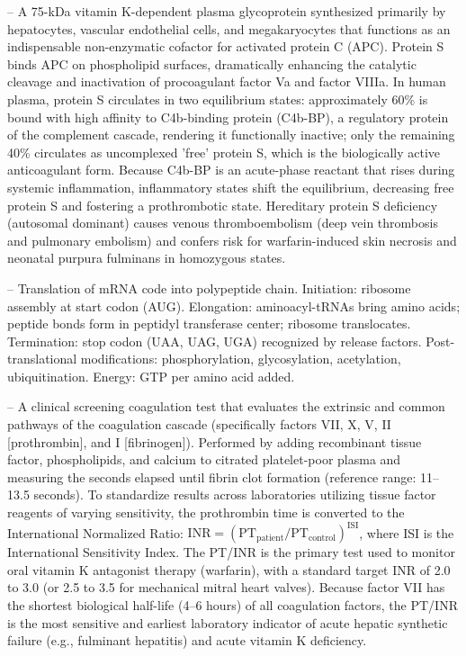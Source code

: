 -- A 75-kDa vitamin K-dependent plasma glycoprotein synthesized primarily by hepatocytes, vascular endothelial cells, and megakaryocytes that functions as an indispensable non-enzymatic cofactor for activated protein C (APC). Protein S binds APC on phospholipid surfaces, dramatically enhancing the catalytic cleavage and inactivation of procoagulant factor Va and factor VIIIa. In human plasma, protein S circulates in two equilibrium states: approximately 60\% is bound with high affinity to C4b-binding protein (C4b-BP), a regulatory protein of the complement cascade, rendering it functionally inactive; only the remaining 40\% circulates as uncomplexed 'free' protein S, which is the biologically active anticoagulant form. Because C4b-BP is an acute-phase reactant that rises during systemic inflammation, inflammatory states shift the equilibrium, decreasing free protein S and fostering a prothrombotic state. Hereditary protein S deficiency (autosomal dominant) causes venous thromboembolism (deep vein thrombosis and pulmonary embolism) and confers risk for warfarin-induced skin necrosis and neonatal purpura fulminans in homozygous states.

-- Translation of mRNA code into polypeptide chain. Initiation: ribosome assembly at start codon (AUG). Elongation: aminoacyl-tRNAs bring amino acids; peptide bonds form in peptidyl transferase center; ribosome translocates. Termination: stop codon (UAA, UAG, UGA) recognized by release factors. Post-translational modifications: phosphorylation, glycosylation, acetylation, ubiquitination. Energy: GTP per amino acid added.

-- A clinical screening coagulation test that evaluates the extrinsic and common pathways of the coagulation cascade (specifically factors VII, X, V, II [prothrombin], and I [fibrinogen]). Performed by adding recombinant tissue factor, phospholipids, and calcium to citrated platelet-poor plasma and measuring the seconds elapsed until fibrin clot formation (reference range: 11--13.5 seconds). To standardize results across laboratories utilizing tissue factor reagents of varying sensitivity, the prothrombin time is converted to the International Normalized Ratio: $\text{INR} = (\text{PT}_{\text{patient}} / \text{PT}_{\text{control}})^{\text{ISI}}$, where ISI is the International Sensitivity Index. The PT/INR is the primary test used to monitor oral vitamin K antagonist therapy (warfarin), with a standard target INR of 2.0 to 3.0 (or 2.5 to 3.5 for mechanical mitral heart valves). Because factor VII has the shortest biological half-life (4--6 hours) of all coagulation factors, the PT/INR is the most sensitive and earliest laboratory indicator of acute hepatic synthetic failure (e.g., fulminant hepatitis) and acute vitamin K deficiency.

